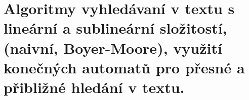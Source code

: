 \section[PAL - automaty - vyhledávání textu]{Algoritmy vyhledávaní v textu s lineární a sublineární složitostí, (naivní, Boyer-Moore), využití konečných automatů pro přesné a přibližné hledání v textu. }